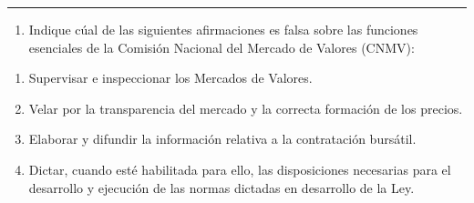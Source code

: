 \documentclass[
  letterpaper,
  DIV=11,
  numbers=noendperiod]{scrreprt}
\providecommand{\tightlist}{%
  \setlength{\itemsep}{0pt}\setlength{\parskip}{0pt}}\usepackage{longtable,booktabs,array}
\begin{document}
\begin{center}\rule{0.5\linewidth}{0.5pt}\end{center}

\begin{enumerate}
\def\labelenumi{\arabic{enumi}.}
\setcounter{enumi}{11}
\tightlist
\item
  Indique cúal de las siguientes afirmaciones es falsa sobre las
  funciones esenciales de la Comisión Nacional del Mercado de Valores
  (CNMV):
\end{enumerate}

\begin{enumerate}
\def\labelenumi{\alph{enumi})}
\item
  Supervisar e inspeccionar los Mercados de Valores.
\item
  Velar por la transparencia del mercado y la correcta formación de los
  precios.
\item
  Elaborar y difundir la información relativa a la contratación
  bursátil.
\item
  Dictar, cuando esté habilitada para ello, las disposiciones necesarias
  para el desarrollo y ejecución de las normas dictadas en desarrollo de
  la Ley.
\end{enumerate}
\end{document}
